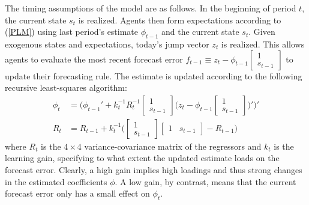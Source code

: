 \documentclass[11pt]{article}
\renewcommand{\[}{\begin{equation}}
\renewcommand{\]}{\end{equation}}
\begin{document}
The timing assumptions of the model are as follows. In the beginning of period $t$, the current state $s_t$ is realized. Agents then form expectations according to (\ref{PLM}) using last period's estimate $\phi_{t-1}$ and the current state $s_t$. Given exogenous states and expectations, today's jump vector $z_t$ is realized. This allows agents to evaluate the most recent forecast error $f_{t-1} \equiv z_t - \phi_{t-1}\begin{bmatrix} 1\\ s_{t-1}\end{bmatrix}$ to update their forecasting rule. The estimate is updated according to the following recursive least-squares algorithm:
\begin{align}
\phi_t  & = \bigg( \phi_{t-1}' + k_t^{-1} R_t^{-1}\begin{bmatrix} 1 \\ s_{t-1} \end{bmatrix}\bigg(z_{t} - \phi_{t-1} \begin{bmatrix} 1 \\ s_{t-1} \end{bmatrix} \bigg)' \bigg)' \\
R_t &= R_{t-1} +  k_t^{-1} \bigg( \begin{bmatrix} 1 \\ s_{t-1} \end{bmatrix} \begin{bmatrix} 1 & s_{t-1} \end{bmatrix}  - R_{t-1} \bigg)
\end{align}
where $R_t$ is the $4\times 4$ variance-covariance matrix of the regressors and $k_t$ is the learning gain, specifying to what extent the updated estimate loads on the forecast error. Clearly, a high gain implies high loadings and thus strong changes in the estimated coefficients $\phi$. A low gain, by contrast, means that the current forecast error only has a small effect on $\phi_t$.
\end{document}
